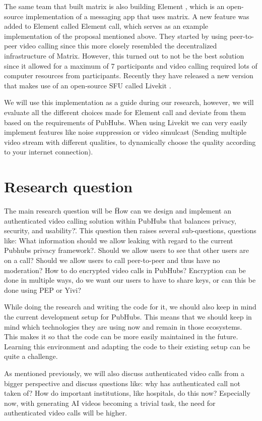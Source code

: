 \documentclass[11pt,a4paper]{article}
\begin{document}
The same team that built matrix is also building Element \cite{ELEMENT}, which is an open-source implementation of a messaging app that uses matrix. A new feature was added to Element called Element call, which serves as an example implementation of the proposal mentioned above. They started by using peer-to-peer video calling since this more closely resembled the decentralized infrastructure of Matrix. However, this turned out to not be the best solution since it allowed for a maximum of 7 participants and video calling required lots of computer resources from participants. Recently they have released a new version that makes use of an open-source SFU called Livekit \cite{LIVEKIT}.

We will use this implementation as a guide during our research, however, we will evaluate all the different choices made for Element call and deviate from them based on the requirements of PubHubs. When using Livekit we can very easily implement features like noise suppression or video simulcast (Sending multiple video stream with different qualities, to dynamically choose the quality according to your internet connection).

\section{Research question}
The main research question will be \"How can we design and implement an authenticated video calling solution within PubHubs that balances privacy, security, and usability?\". This question then raises several sub-questions, questions like: What information should we allow leaking with regard to the current Pubhubs privacy framework?. Should we allow users to see that other users are on a call? Should we allow users to call peer-to-peer and thus have no moderation? How to do encrypted video calls in PubHubs? Encryption can be done in multiple ways, do we want our users to have to share keys, or can this be done using PEP or Yivi?

While doing the research and writing the code for it, we should also keep in mind the current development setup for PubHubs. This means that we should keep in mind which technologies they are using now and remain in those ecosystems. This makes it so that the code can be more easily maintained in the future. Learning this environment and adapting the code to their existing setup can be quite a challenge.

As mentioned previously, we will also discuss authenticated video calls from a bigger perspective and discuss questions like: why has authenticated call not taken of? How do important institutions, like hospitals, do this now? Especially now, with generating AI videos becoming a trivial task, the need for authenticated video calls will be higher. 



\end{document}
